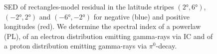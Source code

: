 \begin{figure}[h!]

  	\caption{SED of rectangles-model residual in the latitude stripes $(\ang{2}, \ang{6})$, $(\ang{-2}, \ang{2})$ and $(\ang{-6}, \ang{-2})$ for negative (blue) and positive longitudes (red). We determine the spectral index of a powerlaw (PL), of an electron distribution emitting gamma-rays via IC and of a proton distribution emitting gamma-rays via $\pi^0$-decay.}
  	\label{fig:SED_with_fits}
\end{figure}

